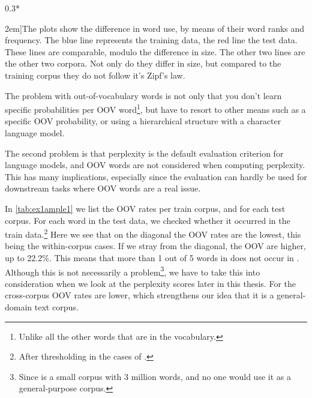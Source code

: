 \begin{figure*}
{\begin{scaletikzpicturetowidth}{0.3*\textwidth}
	\end{scaletikzpicturetowidth}}%
	
	\caption[][2em]{The plots show the difference in word use, by means of their word ranks and frequency. The blue line represents the training data, the red line the test data. These lines are comparable, modulo the difference in size. The other two lines are the other two corpora. Not only do they differ in size, but compared to the training corpus they do not follow it's Zipf's law.}
\end{figure*}

The problem with out-of-vocabulary words is not only that you don't learn specific probabilities per OOV word\footnote{Unlike all the other words that are in the vocabulary.}, but have to resort to other means such as a specific OOV probability, or using a hierarchical structure with a character language model.

The second problem is that perplexity is the default evaluation criterion for language models, and OOV words are not considered when computing perplexity. This has many implications, especially since the evaluation can hardly be used for downstream tasks where OOV words are a real issue.

In \cref{tab:ex1ample1} we list the OOV rates per train corpus, and for each test corpus. For each word in the test data, we checked whether it occurred in the train data.\footnote{After thresholding in the cases of \obw.}
Here we see that on the diagonal the OOV rates are the lowest, this being the within-corpus cases. If we stray from the diagonal, the OOV are higher, up to 22.2\%. This means that more than 1 out of 5 words in \wp does not occur in \emea. Although this is not necessarily a problem\footnote{Since \emea is a small corpus with 3 million words, and no one would use it as a general-purpose corpus.}, we have to take this into consideration when we look at the perplexity scores later in this thesis.
For \obw the cross-corpus OOV rates are lower, which strengthens our idea that it is a general-domain text corpus.

